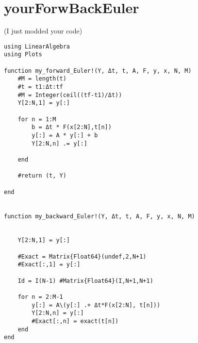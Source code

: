 \documentclass[12pt]{article}
\begin{document}
\pagebreak

\section*{your\textunderscore ForwBack\textunderscore Euler}
(I just modded your code)
\begin{verbatim}
using LinearAlgebra
using Plots

function my_forward_Euler!(Y, Δt, t, A, F, y, x, N, M)
    #M = length(t)
    #t = t1:Δt:tf
    #M = Integer(ceil((tf-t1)/Δt))
    Y[2:N,1] = y[:]

    for n = 1:M
        b = Δt * F(x[2:N],t[n])
        y[:] = A * y[:] + b
        Y[2:N,n] .= y[:]

    end

    #return (t, Y)

end


function my_backward_Euler!(Y, Δt, t, A, F, y, x, N, M)


    Y[2:N,1] = y[:]

    #Exact = Matrix{Float64}(undef,2,N+1)
    #Exact[:,1] = y[:]

    Id = I(N-1) #Matrix{Float64}(I,N+1,N+1)

    for n = 2:M-1
        y[:] = A\(y[:] .+ Δt*F(x[2:N], t[n]))
        Y[2:N,n] = y[:]
        #Exact[:,n] = exact(t[n])
    end
end
\end{verbatim}
\end{document}
